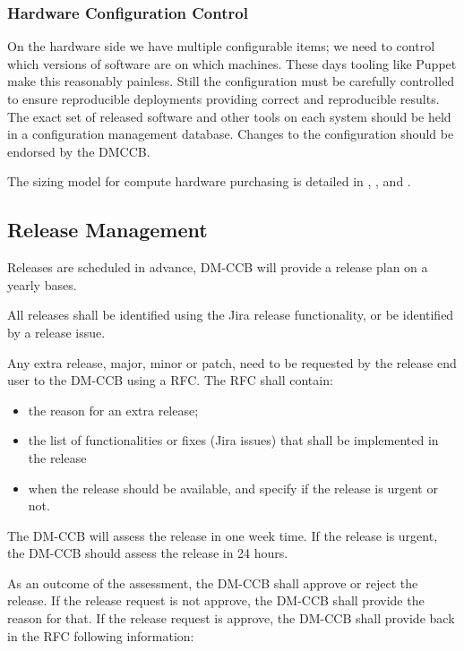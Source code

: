 \subsubsection{Hardware Configuration Control}

On the hardware side we have multiple configurable items; we need to control which versions of software are on which machines. These days tooling like Puppet make this reasonably painless. Still the configuration  must be carefully controlled to ensure reproducible deployments providing correct and reproducible results. The exact set of released software and other tools on each system should be held in a configuration management database.
Changes to the configuration should be endorsed by the DMCCB.

The sizing model for compute hardware purchasing is detailed in , , and .

\subsection {Release Management } \label{sect:release}


Releases are scheduled in advance, DM-CCB will provide a release plan on a yearly bases.

All releases shall be identified using the Jira release functionality, or be identified by a release issue.

Any extra release, major, minor or patch, need to be requested by the release end user to the DM-CCB using a RFC. The RFC shall contain:

\begin{itemize}
\item the reason for an extra release;
\item the list of functionalities or fixes (Jira issues) that shall be implemented in the release
\item when the release should be available, and specify if the release is urgent or not.
\end{itemize}

The DM-CCB will assess the release in one week time. If the release is urgent, the DM-CCB should assess the release in 24 hours.

As an outcome of the assessment, the DM-CCB shall approve or reject the release.
If the release request is not approve, the DM-CCB shall provide the reason for that.
If the release request is approve, the DM-CCB shall provide back in the RFC following information:

